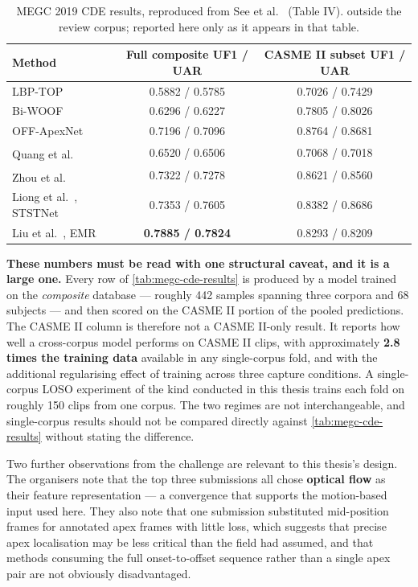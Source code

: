\begin{table}[htbp]
	\centering
	\begin{tabular}{l c c}
		\hline
		\textbf{Method} & \textbf{Full composite UF1 / UAR} & \textbf{CASME II subset UF1 / UAR} \\
		\hline
		LBP-TOP~\cite{zhaoG2007}                 & 0.5882 / 0.5785 & 0.7026 / 0.7429 \\
		Bi-WOOF~\cite{liong2018}                 & 0.6296 / 0.6227 & 0.7805 / 0.8026 \\
		OFF-ApexNet~\cite{liong2019a}            & 0.7196 / 0.7096 & 0.8764 / 0.8681 \\
		Quang et al.\textsuperscript{\textdagger} & 0.6520 / 0.6506 & 0.7068 / 0.7018 \\
		Zhou et al.\textsuperscript{\textdagger}  & 0.7322 / 0.7278 & 0.8621 / 0.8560 \\
		Liong et al.~\cite{liong2019b}, STSTNet  & 0.7353 / 0.7605 & 0.8382 / 0.8686 \\
		Liu et al.~\cite{liu2019}, EMR           & \textbf{0.7885 / 0.7824} & 0.8293 / 0.8209 \\
		\hline
	\end{tabular}
	\caption[MEGC 2019 Composite Database Evaluation results]{MEGC 2019 CDE results, reproduced from See et al.~\cite{see2019} (Table IV). \textdagger{} outside the review corpus; reported here only as it appears in that table.}
	\label{tab:megc-cde-results}
\end{table}

\textbf{These numbers must be read with one structural caveat, and it is a large one.} Every row of \autoref{tab:megc-cde-results} is produced by a model trained on the \textit{composite} database --- roughly 442 samples spanning three corpora and 68 subjects --- and then scored on the CASME II portion of the pooled predictions. The CASME II column is therefore not a CASME II-only result. It reports how well a cross-corpus model performs on CASME II clips, with approximately \textbf{2.8 times the training data} available in any single-corpus fold, and with the additional regularising effect of training across three capture conditions. A single-corpus LOSO experiment of the kind conducted in this thesis trains each fold on roughly 150 clips from one corpus. The two regimes are not interchangeable, and single-corpus results should not be compared directly against \autoref{tab:megc-cde-results} without stating the difference.

Two further observations from the challenge are relevant to this thesis's design. The organisers note that the top three submissions all chose \textbf{optical flow} as their feature representation --- a convergence that supports the motion-based input used here. They also note that one submission substituted mid-position frames for annotated apex frames with little loss, which suggests that precise apex localisation may be less critical than the field had assumed, and that methods consuming the full onset-to-offset sequence rather than a single apex pair are not obviously disadvantaged.

